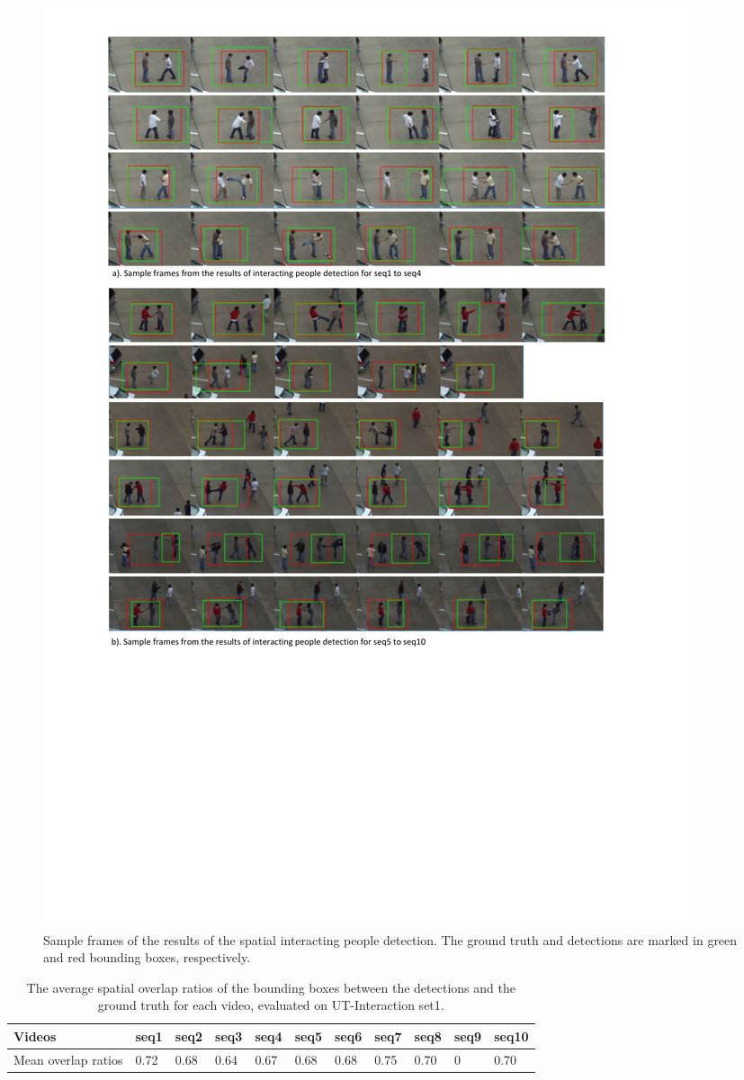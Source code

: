 \begin{figure}
	\includegraphics[trim=2cm 9cm 0cm 1cm]{fig01/interacting_person_det.pdf}
	\caption{Sample frames of the results of the spatial interacting people detection. The ground truth and detections are marked in green and red bounding boxes, respectively.}
	\label{fig:int_det}
\end{figure}

\begin{table}
	\caption{The average spatial overlap ratios of the bounding boxes between the detections and the ground truth for each video, evaluated on UT-Interaction set1.}
	\begin{center}
		\begin{tabular}{| m{2.5cm} || m{0.8cm} | m{0.8cm} | m{0.8cm} | m{0.8cm} | m{0.8cm} | m{0.8cm} | m{0.8cm} | m{0.8cm} | m{0.8cm} | m{0.8cm} |}
			\hline
			Videos & seq1 & seq2 & seq3& seq4& seq5& seq6& seq7& seq8& seq9& seq10 \\ \hline \hline
			Mean overlap ratios & 0.72 & 0.68 & 0.64 & 0.67& 0.68& 0.68& 0.75& 0.70& 0& 0.70 \\ \hline 
		\end{tabular}
		\label{table:mean_overlap_ratio}
	\end{center}
\end{table}
 

